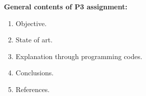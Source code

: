\documentclass[12pt,spanish]{article}
\begin{document}
\vspace{0.5cm} 
\noindent
{\bf \Large General contents of P3 assignment: 
}                                                                               
     
\begin{enumerate}
 \setlength{\itemsep}{-0.1cm}
\item Objective. 
\item State of art. 
\item Explanation through programming codes. 
\item Conclusions. 
\item References. 
\end{enumerate}
\end{document}
